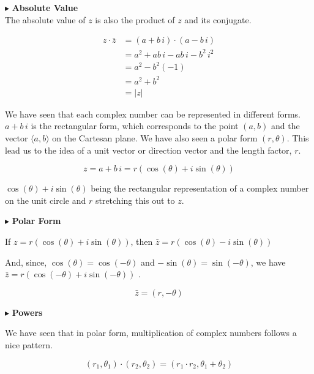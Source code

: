 \documentclass{ximera}
\begin{document}
$\blacktriangleright$ \textbf{Absolute Value}  \\

The absolute value of $z$ is also the product of $z$ and its conjugate.


\begin{explanation}

\begin{align*}
z \cdot \bar{z} &= (a + b \, i) \cdot (a - b \, i) \\
                &= a^2 + ab \, i - ab \, i - b^2 \, i^2 \\
                &= a^2 - b^2 (-1) \\
                &= a^2 + b^2  \\
                &= |z|  
\end{align*}


\end{explanation}






We have seen that each complex number can be represented in different forms.  $a + b \, i$ is the rectangular form, which corresponds to the point $(a, b)$ and the vector $\langle a, b\rangle$ on the Cartesan plane.  We have also seen a polar form $(r, \theta)$.  This lead us to the idea of a unit vector or direction vector and the length factor, $r$.

\[ z = a + b \, i = r (\cos(\theta) + i \sin(\theta))  \]


$\cos(\theta) + i \sin(\theta)$ being the rectangular representation of a complex number on the unit circle and $r$ stretching this out to $z$.






$\blacktriangleright$ \textbf{Polar Form}

If $z = r (\cos(\theta) + i \sin(\theta))$, then $\bar{z} = r (\cos(\theta) - i \sin(\theta))$

And, since, $\cos(\theta) = \cos(-\theta)$ and $-\sin(\theta) = \sin(-\theta)$, we have $\bar{z} = r (\cos(-\theta) + i \sin(-\theta))$ .


\[   \bar{z} = (r, -\theta) \]




$\blacktriangleright$ \textbf{Powers}



We have seen that in polar form, multiplication of complex numbers follows a nice pattern.


\[   (r_1, \theta_1) \cdot (r_2, \theta_2) = (r_1 \cdot r_2, \theta_1 + \theta_2)                \]
\end{document}
